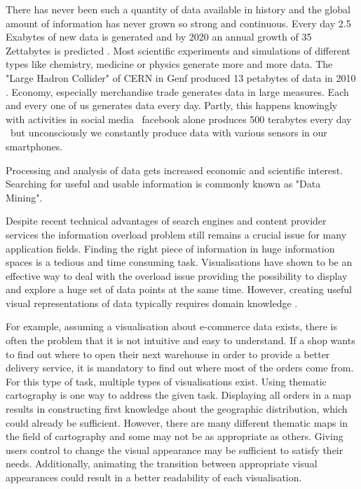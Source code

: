 There has never been such a quantity of data available in history and the global amount of information has never grown so strong and continuous. Every day 2.5 Exabytes of new data is generated and by 2020 an annual growth of 35 Zettabytes is predicted . Most scientific experiments and simulations of different types like chemistry, medicine or physics generate more and more data. The "Large Hadron Collider" of CERN in Genf produced 13 petabytes of data in 2010 . Economy, especially merchandise trade generates data in large measures. Each and every one of us generates data every day. Partly, this happens knowingly with activities in social media \textendash\ facebook alone produces 500 terabytes every day  \textendash\ but unconsciously we constantly produce data with various sensors in our smartphones.

Processing and analysis of data gets increased economic and scientific interest. Searching for useful and usable information is commonly known as "Data Mining".

Despite recent technical advantages of search engines and content provider services the information overload problem still remains a crucial issue for many application fields. Finding the right piece of information in huge information spaces is a tedious and time consuming task. Visualisations have shown to be an effective way to deal with the overload issue providing the possibility to display and explore a huge set of data points at the same time. However, creating useful visual representations of data typically requires domain knowledge .

For example, assuming a visualisation about e-commerce data exists, there is often the problem that it is not intuitive and easy to understand. If a shop wants to find out where to open their next warehouse in order to provide a better delivery service, it is mandatory to find out where most of the orders come from. For this type of task, multiple types of visualisations exist. Using thematic cartography is one way to address the given task. Displaying all orders in a map results in constructing first knowledge about the geographic distribution, which could already be sufficient. However, there are many different thematic maps in the field of cartography and some may not be as appropriate as others. Giving users control to change the visual appearance may be sufficient to satisfy their needs. Additionally, animating the transition between appropriate visual appearances could result in a better readability of each visualisation.


